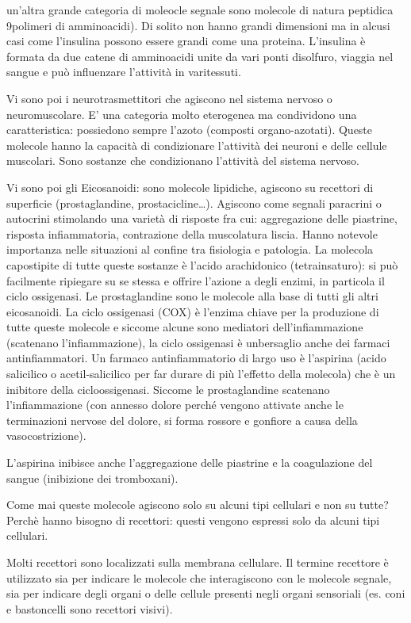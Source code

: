 \documentclass[]{article}
\begin{document}
un'altra grande categoria di moleocle segnale sono molecole di natura
peptidica 9polimeri di amminoacidi). Di solito non hanno grandi
dimensioni ma in alcusi casi come l'insulina possono essere grandi come
una proteina. L'insulina è formata da due catene di amminoacidi unite da
vari ponti disolfuro, viaggia nel sangue e può influenzare l'attività in
varitessuti.

Vi sono poi i neurotrasmettitori che agiscono nel sistema nervoso o
neuromuscolare. E' una categoria molto eterogenea ma condividono una
caratteristica: possiedono sempre l'azoto (composti organo-azotati).
Queste molecole hanno la capacità di condizionare l'attività dei neuroni
e delle cellule muscolari. Sono sostanze che condizionano l'attività del
sistema nervoso.

Vi sono poi gli Eicosanoidi: sono molecole lipidiche, agiscono su
recettori di superficie (prostaglandine, prostacicline\ldots{}).
Agiscono come segnali paracrini o autocrini stimolando una varietà di
risposte fra cui: aggregazione delle piastrine, risposta infiammatoria,
contrazione della muscolatura liscia. Hanno notevole importanza nelle
situazioni al confine tra fisiologia e patologia. La molecola
capostipite di tutte queste sostanze è l'acido arachidonico
(tetrainsaturo): si può facilmente ripiegare su se stessa e offrire
l'azione a degli enzimi, in particola il ciclo ossigenasi. Le
prostaglandine sono le molecole alla base di tutti gli altri
eicosanoidi. La ciclo ossigenasi (COX) è l'enzima chiave per la
produzione di tutte queste molecole e siccome alcune sono mediatori
dell'infiammazione (scatenano l'infiammazione), la ciclo ossigenasi è
unbersaglio anche dei farmaci antinfiammatori. Un farmaco
antinfiammatorio di largo uso è l'aspirina (acido salicilico o
acetil-salicilico per far durare di più l'effetto della molecola) che è
un inibitore della cicloossigenasi. Siccome le prostaglandine scatenano
l'infiammazione (con annesso dolore perché vengono attivate anche le
terminazioni nervose del dolore, si forma rossore e gonfiore a causa
della vasocostrizione).

L'aspirina inibisce anche l'aggregazione delle piastrine e la
coagulazione del sangue (inibizione dei tromboxani).

Come mai queste molecole agiscono solo su alcuni tipi cellulari e non su
tutte? Perchè hanno bisogno di recettori: questi vengono espressi solo
da alcuni tipi cellulari.

Molti recettori sono localizzati sulla membrana cellulare. Il termine
recettore è utilizzato sia per indicare le molecole che interagiscono
con le molecole segnale, sia per indicare degli organi o delle cellule
presenti negli organi sensoriali (es. coni e bastoncelli sono recettori
visivi).
\end{document}
